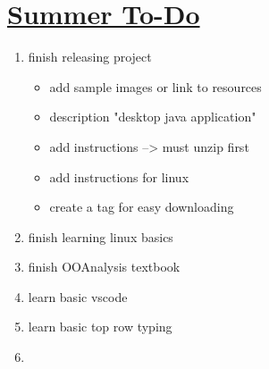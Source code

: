 \documentclass[10pt]{article}
\begin{document}
\section*{\underline{Summer To-Do}}

\begin{enumerate}
    \item finish releasing project
    \begin{itemize}
	\item add sample images or link to resources
	\item description "desktop java application"
	\item add instructions --> must unzip first
	\item add instructions for linux
	\item create a tag for easy downloading
    \end{itemize}
    \item finish learning linux basics
    \item finish OOAnalysis textbook
    \item learn basic vscode
    \item learn basic top row typing
    \item 

\end{enumerate}
\end{document}
